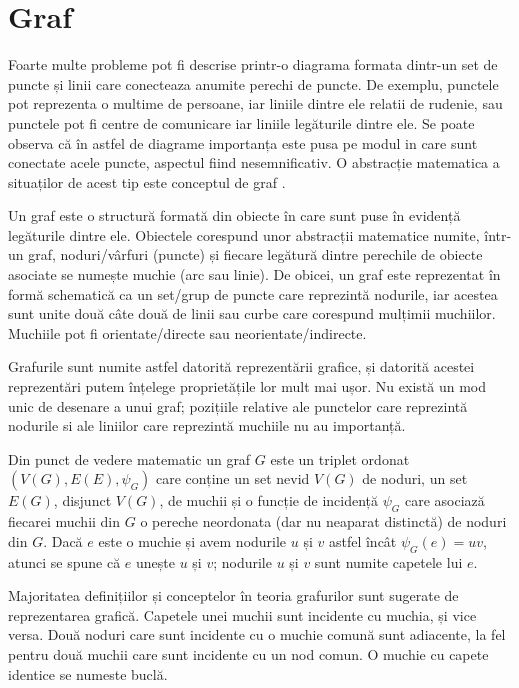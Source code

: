 \newpage
\section{Graf}

Foarte multe probleme pot fi descrise printr-o diagrama formata dintr-un set de puncte și linii care conecteaza anumite perechi de puncte.
De exemplu, punctele pot reprezenta o multime de persoane, iar liniile dintre ele relatii de rudenie, sau punctele pot fi centre de comunicare 
iar liniile legăturile dintre ele. Se poate observa că în astfel de diagrame importanța este pusa pe modul in care sunt conectate acele puncte,
aspectul fiind nesemnificativ. O abstracție matematica a situaților de acest tip este conceptul de graf \cite{graf}.\newline

Un graf este o structură formată din obiecte în care sunt puse în evidență legăturile dintre ele. 
Obiectele corespund unor abstracții matematice numite, într-un graf, noduri/vârfuri (puncte) și fiecare legătură 
dintre perechile de obiecte asociate se numește muchie (arc sau linie). 
De obicei, un graf este reprezentat în formă schematică ca un set/grup de puncte care reprezintă nodurile, iar acestea sunt unite două 
câte două de linii sau curbe care corespund mulțimii muchiilor. Muchiile pot fi orientate/directe sau neorientate/indirecte.\newline

Grafurile sunt numite astfel datorită reprezentării grafice, și datorită acestei reprezentări putem înțelege proprietățile lor mult mai ușor.
Nu există un mod unic de desenare a unui graf; pozițiile relative ale punctelor care reprezintă nodurile si ale liniilor care reprezintă muchiile nu au importanță.\newline

Din punct de vedere matematic un graf \(G\) este un triplet ordonat \((V(G),E(E),\psi_G)\) care conține un set nevid \(V(G)\) de noduri, un set \(E(G)\),
disjunct \(V(G)\), de muchii și o funcție de incidență \(\psi_G\) care asociază fiecarei muchii din \(G\) o pereche neordonata (dar nu neaparat distinctă)
de noduri din \(G\). Dacă \(e\) este o muchie și avem nodurile \(u\) și \(v\) astfel încât \(\psi_G(e)=uv\), atunci se spune că \(e\) unește \(u\) și \(v\); 
nodurile \(u\) și \(v\) sunt numite capetele lui \(e\).\cite{graf}\newline

Majoritatea definițiilor și conceptelor în teoria grafurilor sunt sugerate de reprezentarea grafică. Capetele unei muchii sunt incidente cu muchia, și vice versa. 
Două noduri care sunt incidente cu o muchie comună sunt adiacente, la fel pentru două muchii care sunt incidente cu un nod comun. O muchie cu capete identice se numeste buclă.\newline

